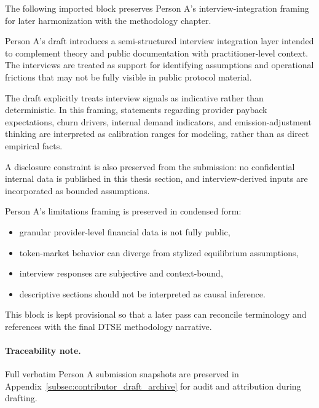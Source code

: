 
The following imported block preserves Person A's interview-integration framing for later harmonization with the methodology chapter.

Person A's draft introduces a semi-structured interview integration layer intended to complement theory and public documentation with practitioner-level context. The interviews are treated as support for identifying assumptions and operational frictions that may not be fully visible in public protocol material.

The draft explicitly treats interview signals as indicative rather than deterministic. In this framing, statements regarding provider payback expectations, churn drivers, internal demand indicators, and emission-adjustment thinking are interpreted as calibration ranges for modeling, rather than as direct empirical facts.

A disclosure constraint is also preserved from the submission: no confidential internal data is published in this thesis section, and interview-derived inputs are incorporated as bounded assumptions.

Person A's limitations framing is preserved in condensed form:
\begin{itemize}
    \item granular provider-level financial data is not fully public,
    \item token-market behavior can diverge from stylized equilibrium assumptions,
    \item interview responses are subjective and context-bound,
    \item descriptive sections should not be interpreted as causal inference.
\end{itemize}

This block is kept provisional so that a later pass can reconcile terminology and references with the final DTSE methodology narrative.

\paragraph{Traceability note.} Full verbatim Person A submission snapshots are preserved in Appendix~\ref{subsec:contributor_draft_archive} for audit and attribution during drafting.
